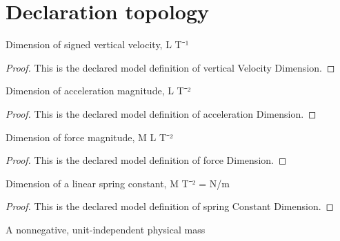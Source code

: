 \section{Declaration topology}
\begin{definition}
  \label{def:physics:phyx-mini-0814:phyxminiproblems-problemphyxmini0814-verticalvelocitydimension}
  Dimension of signed vertical velocity, L T⁻¹
\end{definition}
\begin{proof}
  This is the declared model definition of vertical Velocity Dimension.
\end{proof}
\begin{definition}
  \label{def:physics:phyx-mini-0814:phyxminiproblems-problemphyxmini0814-accelerationdimension}
  Dimension of acceleration magnitude, L T⁻²
\end{definition}
\begin{proof}
  This is the declared model definition of acceleration Dimension.
\end{proof}
\begin{definition}
  \label{def:physics:phyx-mini-0814:phyxminiproblems-problemphyxmini0814-forcedimension}
  Dimension of force magnitude, M L T⁻²
\end{definition}
\begin{proof}
  This is the declared model definition of force Dimension.
\end{proof}
\begin{definition}
  \label{def:physics:phyx-mini-0814:phyxminiproblems-problemphyxmini0814-springconstantdimension}
  Dimension of a linear spring constant, M T⁻² = N/m
\end{definition}
\begin{proof}
  This is the declared model definition of spring Constant Dimension.
\end{proof}
\begin{definition}
  \label{def:physics:phyx-mini-0814:phyxminiproblems-problemphyxmini0814-massquantity}
  A nonnegative, unit-independent physical mass
\end{definition}
